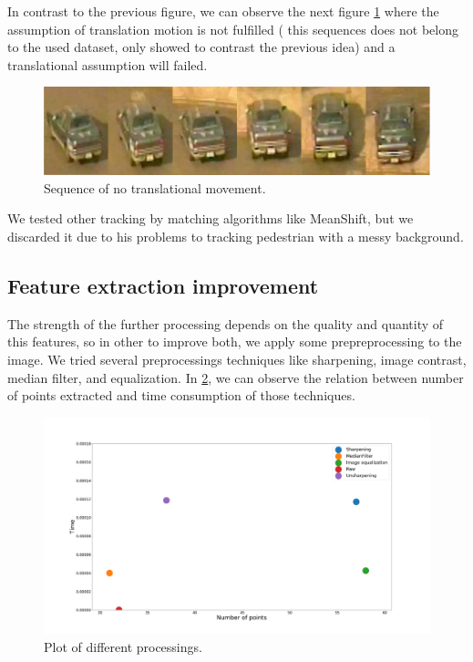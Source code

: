 In contrast to the previous figure, we can observe the next figure \ref{experiTrack2} where the assumption of translation motion is not fulfilled ( this sequences does not belong to the used dataset, only showed to contrast the previous idea) and a translational assumption will failed.

\begin{figure}[H]
\centering         
\includegraphics[width=0.9\linewidth]{changeCamera/out2.png}
\caption{Sequence of no translational movement.} \label{experiTrack2}
\end{figure}

We tested other tracking by matching algorithms like MeanShift, but we discarded it due to his problems to tracking pedestrian with a messy background.






\subsection{Feature extraction improvement}\label{exper:validation}

The strength of the further processing depends on the quality and quantity of this features, so in other to improve both, we apply some prepreprocessing to the image. We tried several preprocessings techniques like sharpening, image contrast, median filter, and equalization. In \ref{experiTrack3}, we can observe the relation between number of points extracted and time consumption of those techniques.




\begin{figure}[H]
\centering         
\includegraphics[width=0.9\linewidth]{tracker/preprocesing.png}
\caption{Plot of different processings.} \label{experiTrack3}
\end{figure}

